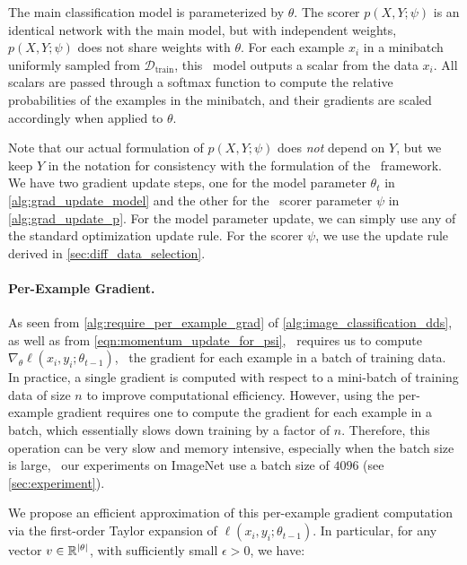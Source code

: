 The main  classification model is parameterized by $\theta$. The scorer $p(X, Y; \psi)$ is an identical network with the main model, but with independent weights, \ie~$p(X, Y; \psi)$ does not share weights with $\theta$. For each example $x_i$ in a minibatch uniformly sampled from $\mathcal{D}_\text{train}$, this \dds~model outputs a scalar from the data $x_i$. All scalars are passed through a softmax function to compute the relative probabilities of the examples in the minibatch, and their gradients are scaled accordingly when applied to $\theta$. 

Note that our actual formulation of $p(X, Y; \psi)$ does \textit{not} depend on $Y$, but we keep $Y$ in the notation for consistency with the formulation of the \dds~framework. We have two gradient update steps, one for the model parameter $\theta_t$ in \autoref{alg:grad_update_model} and the other for the \dds~scorer parameter $\psi$ in \autoref{alg:grad_update_p}. For the model parameter update, we can simply use any of the standard optimization update rule. For the scorer $\psi$, we use the update rule derived in \autoref{sec:diff_data_selection}.

\paragraph{Per-Example Gradient.} As seen from \autoref{alg:require_per_example_grad} of \autoref{alg:image_classification_dds}, as well as from \autoref{eqn:momentum_update_for_psi}, \dds~requires us to compute $\nabla_\theta \ell(x_i, y_i; \theta_{t-1})$, \ie~the gradient for each example in a batch of training data. In practice, a single gradient is computed with respect to a mini-batch of training data of size $n$ to improve computational efficiency. However, using the per-example gradient requires one to compute the gradient for each example in a batch, which essentially slows down training by a factor of $n$. Therefore, this operation can be very slow and memory intensive, especially when the batch size is large, \eg~our experiments on ImageNet use a batch size of $4096$ (see \autoref{sec:experiment}).  

We propose an efficient approximation of this per-example gradient computation via the first-order Taylor expansion of $\ell(x_i, y_i; \theta_{t-1})$. In particular, for any vector $v \in \mathbb{R}^{\left| \theta \right|}$, with sufficiently small $\epsilon > 0$, we have:

